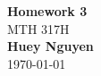 \begin{titlepage}
    \begin{center}
    {\fontsize{40}{48}\selectfont \bfseries Homework 3} 
    \\\vspace{20pt}
    {\LARGE MTH 317H} \\
    \vspace{20pt}
    \textbf{Huey Nguyen}
    \vspace{8pt}
    \\\today
    \end{center}
\end{titlepage}